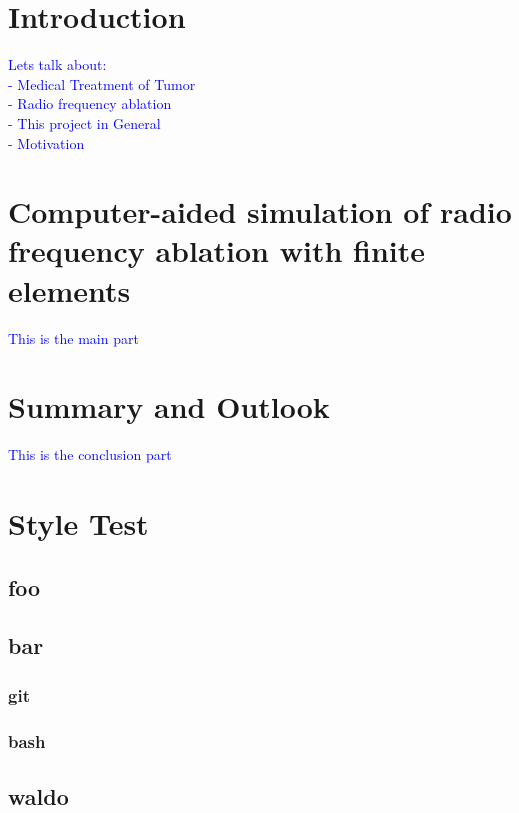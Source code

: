 \documentclass[parskip=half, titlepage=yes, 12pt, BCOR=12mm, DIV=calc]{scrartcl}
\begin{document}
\maketitle
\tableofcontents
\listoffigures
\listoftables
\lstlistoflistings
\clearpage



\section{Introduction}

\textcolor{blue}{Lets talk about:\\
- Medical Treatment of Tumor\\
- Radio frequency ablation\\
- This project in General\\
- Motivation
}


\section{Computer-aided simulation of radio frequency ablation with finite elements}

\textcolor{blue}
{
This is the main part
}



\section{Summary and Outlook}

\textcolor{blue}
{
This is the conclusion part
}

\newpage


\section{Style Test}

\subsection{foo}

\blindtext


\subsection{bar}

\subsubsection{git}

\subsubsection{bash}

\subsection{waldo}

\Blindtext


\clearpage
\nocite{*}
\printbibliography

\newpage

\appendix

 
\end{document}
